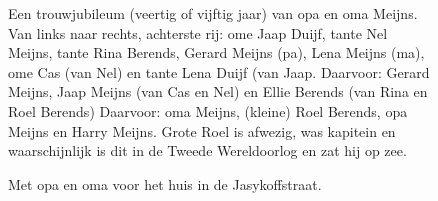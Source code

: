 \documentclass[12pt,twoside]{memoir}
\begin{document}
\begin{figure}
\caption*{\footnotesize Een trouwjubileum (veertig of vijftig jaar) van opa en oma Meijns. Van links naar rechts, achterste rij: ome Jaap Duijf, tante Nel Meijns, tante Rina Berends, Gerard Meijns (pa), Lena Meijns (ma), ome Cas (van Nel) en tante Lena Duijf (van Jaap.
Daarvoor: Gerard Meijns, Jaap Meijns (van Cas en Nel) en Ellie Berends (van Rina en Roel Berends)
Daarvoor: oma Meijns, (kleine) Roel Berends, opa Meijns en Harry Meijns. Grote Roel is afwezig, was kapitein en waarschijnlijk is dit in de Tweede Wereldoorlog en zat hij op zee.}
\end{figure}

\begin{figure}
\caption*{\footnotesize Met opa en oma voor het huis in de Jasykoffstraat.}
\end{figure}
\end{document}
